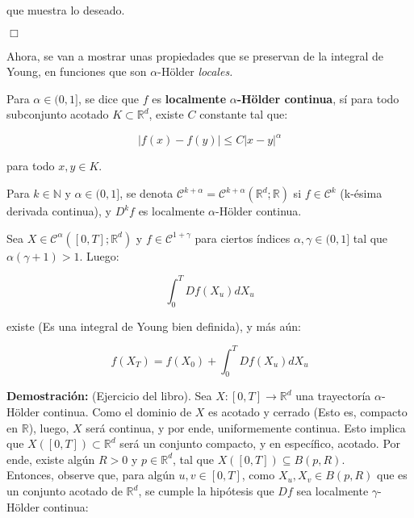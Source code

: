 que muestra lo deseado.

\begin{flushright}
	$\Box$
\end{flushright}

Ahora, se van a mostrar unas propiedades que se preservan de la integral de Young, en funciones que son $\alpha$-Hölder \textit{locales.}


\begin{boxDef}
	Para $\alpha \in (0,1]$, se dice que $f$ es \textbf{localmente} $\mathbb{\alpha}$\textbf{-Hölder continua}, sí para todo subconjunto acotado $K \subset \mathbb{R}^d$, existe $C$ constante tal que:

	\[
		\lvert f(x) - f(y) \rvert \leq C \lvert x - y \rvert^{\alpha}
	\]

	para todo $x, y \in K$.

\end{boxDef}

Para $k \in \mathbb{N}$ y $\alpha \in (0,1]$, se denota $\mathcal{C}^{k + \alpha} = \mathcal{C}^{k + \alpha} (\mathbb{R}^d; \mathbb{R})$ si $f \in \mathcal{C}^k$ (k-ésima derivada continua), y $D^k f$ es localmente $\alpha$-Hölder continua.


\begin{lema}
	Sea $X \in \mathcal{C}^{\alpha} ([0,T]; \mathbb{R}^d)$ y $f \in \mathcal{C}^{1 + \gamma}$ para ciertos índices $\alpha, \gamma \in (0, 1]$ tal que $\alpha (\gamma + 1) > 1$. Luego:

	\[
		\int_0^T D f(X_u) dX_u
	\]

	existe (Es una integral de Young bien definida), y más aún:

	\[
		f(X_T) = f(X_0) + \int_0^T Df (X_u) dX_u 	
	\]

\end{lema}

\textbf{Demostración:} (Ejercicio del libro). Sea $X: [0,T] \rightarrow \mathbb{R}^d$ una trayectoría $\alpha$-Hölder continua. Como el dominio de $X$ es acotado y cerrado (Esto es, compacto en $\mathbb{R}$), luego, $X$ será continua, y por ende, uniformemente continua. Esto implica que $X([0,T]) \subset \mathbb{R}^d$ será un conjunto compacto, y en específico, acotado. Por ende, existe algún $R > 0$ y $p \in \mathbb{R}^d$, tal que $X([0,T]) \subseteq B(p, R)$. \\

Entonces, observe que, para algún $u, v \in [0,T]$, como $X_u, X_v \in B(p, R)$ que es un conjunto acotado de $\mathbb{R}^d$, se cumple la hipótesis que $D f$ sea localmente $\gamma$-Hölder continua:

